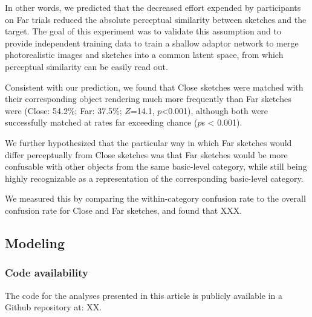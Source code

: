 \documentclass[9pt,twocolumn,twoside]{pnas-new}
\begin{document}
In other words, we predicted that the decreased effort expended by participants on Far trials reduced the absolute perceptual similarity between sketches and the target. The goal of this experiment was to validate this assumption and to provide independent training data to train a shallow adaptor network to merge photorealistic images and sketches into a common latent space, from which perceptual similarity can be easily read out.


Consistent with our prediction, we found that Close sketches were matched with their corresponding object rendering much more frequently than Far sketches were (Close: 54.2\%; Far: 37.5\%; $Z$=14.1, $p$<0.001), although both were successfully matched at rates far exceeding chance ($p$s < 0.001).



We further hypothesized that the particular way in which Far sketches would differ perceptually from Close sketches was that Far sketches would be more confusable with other objects from the same basic-level category, while still being highly recognizable as a representation of the corresponding basic-level category.

We measured this by comparing the within-category confusion rate to the overall confusion rate for Close and Far sketches, and found that XXX.

\subsection*{Modeling}





\subsubsection*{Code availability} The code for the analyses presented in this article is publicly available in a Github repository at: XX.
\end{document}
